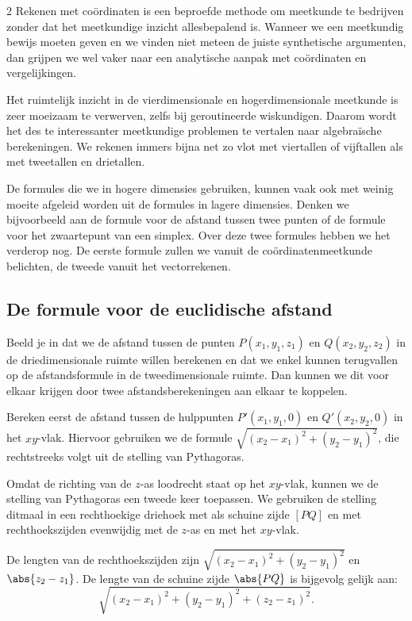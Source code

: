 \begin{multicols}{2}
Rekenen met coördinaten is een beproefde methode om meetkunde te bedrijven zonder dat het meetkundige inzicht allesbepalend is. Wanneer we een meetkundig bewijs moeten geven en we vinden niet meteen de juiste synthetische argumenten, dan grijpen we wel vaker naar een analytische aanpak met coördinaten en vergelijkingen.

Het ruimtelijk inzicht in de vierdimensionale en hogerdimensionale meetkunde is zeer moeizaam te verwerven, zelfs bij geroutineerde wiskundigen. Daarom wordt het des te interessanter meetkundige problemen te vertalen naar algebraïsche berekeningen. We rekenen immers bijna net zo vlot met viertallen of vijftallen als met tweetallen en drietallen. 

De formules die we in hogere dimensies gebruiken, kunnen vaak ook met weinig moeite afgeleid worden uit de formules in lagere dimensies. Denken we bijvoorbeeld aan de formule voor de afstand tussen twee punten of de formule voor het zwaartepunt van een simplex. Over deze twee formules hebben we het verderop nog. De eerste formule zullen we vanuit de coördinatenmeetkunde belichten, de tweede vanuit het vectorrekenen.

\subsection{De formule voor de euclidische afstand}

Beeld je in dat we de afstand tussen de punten $P(x_1, y_1, z_1)$ en $Q(x_2, y_2, z_2)$ in de driedimensionale ruimte willen berekenen en dat we enkel kunnen terugvallen op de afstandsformule in de tweedimensionale ruimte. Dan kunnen we dit voor elkaar krijgen door twee afstandsberekeningen aan elkaar te koppelen.

Bereken eerst de afstand tussen de hulppunten $P'(x_1, y_1, 0)$ en $Q'(x_2, y_2, 0)$ in het $xy$-vlak. Hiervoor gebruiken we de formule $\sqrt{(x_2-x_1)^2+(y_2-y_1)^2}$, die rechtstreeks volgt uit de stelling van Pythagoras. 

Omdat de richting van de $z$-as loodrecht staat op het $xy$-vlak, kunnen we de stelling van Pythagoras een tweede keer toepassen. We gebruiken de stelling ditmaal in een rechthoekige driehoek met als schuine zijde $[PQ]$ en met rechthoekszijden evenwijdig met de $z$-as en met het $xy$-vlak. 

De lengten van de rechthoekszijden zijn $\sqrt{(x_2-x_1)^2+(y_2-y_1)^2}$ en $\abs{z_2-z_1}$. De lengte van de schuine zijde $\abs{PQ}$ is bijgevolg gelijk aan:
\[ \sqrt{(x_2-x_1)^2+(y_2-y_1)^2+(z_2-z_1)^2}.\]


\end{multicols}
